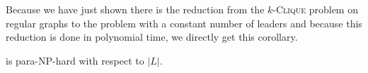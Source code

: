 Because we have just shown there is the reduction from the $k$-\textsc{Clique} problem on regular graphs to the
\HL problem with a constant number of leaders and because this reduction is done in polynomial time,
we directly get this corollary.

\begin{corollary}
    \HL is para-NP-hard with respect to $|L|$.
\end{corollary}
